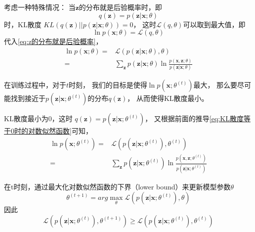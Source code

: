 \documentclass[withoutpreface,bwprint]{NoteBook}
\begin{document}
考虑一种特殊情况：
当$\mathbf{z}$的分布就是后验概率时，即
\begin{equation}
    \label{eq:z的分布就是后验概率}
    q(\mathbf{z}) = p(\mathbf{z}|\mathbf{x};\theta)
\end{equation}
时，KL散度 $ KL(q(\mathbf{z})||p(\mathbf{z}|\mathbf{x};\theta)) = 0 $，
这时$\mathcal{L}(q,\theta)$可以取到最大值，即
$$
\ln p(\mathbf{x};\theta) = \mathcal{L}(q,\theta)
$$
代入\cref{eq:z的分布就是后验概率}，
\begin{align}
    \label{eq:KL散度等于0时的对数似然函数}
    \ln p(\mathbf{x};\theta) 
    =& \mathcal{L}( p(\mathbf{z}|\mathbf{x};\theta),\theta) \nonumber \\
    =& \sum_{\mathbf{z}} p(\mathbf{z}|\mathbf{x};\theta) \ln \frac{p(\mathbf{x},\mathbf{z};\theta)}{p(\mathbf{z}|\mathbf{x};\theta)}
\end{align}

在训练过程中，对于$t$时刻，
我们的目标是使得$\ln p(\mathbf{x};\theta^{(t)})$最大，
那么要尽可能找到接近于$p(\mathbf{z}|\mathbf{x};\theta^{(t)})$的分布$q(\mathbf{z})$，
从而使得KL散度最小。

KL散度最小为0，这时
$
q(\mathbf{z}) = p(\mathbf{z}|\mathbf{x};\theta^{(t)})
$，
又根据前面的推导\cref{eq:KL散度等于0时的对数似然函数}可知，
\begin{align}
    \label{eq:t时刻KL散度等于0时的对数似然函数}
    \ln p(\mathbf{x};\theta^{(t)}) 
    =& \mathcal{L}( p(\mathbf{z}|\mathbf{x};\theta^{(t)}),\theta^{(t)}) \nonumber \\
    =& \sum_{\mathbf{z}} p(\mathbf{z}|\mathbf{x};\theta^{(t)}) \ln \frac{p(\mathbf{x},\mathbf{z};\theta^{(t)})}{p(\mathbf{z}|\mathbf{x};\theta^{(t)})}
\end{align}

在t时刻，通过最大化对数似然函数的下界（lower bound）来更新模型参数$\theta$
\begin{equation}
    \label{eq:t时刻更新模型参数theta}
    \theta^{(t+1)} = arg\max_{\theta} \mathcal{L}( p(\mathbf{z}|\mathbf{x};\theta^{(t)}),\theta)
\end{equation}
因此
\begin{equation}
    \label{eq:t时刻更新模型参数theta后的lower_bound}
    \mathcal{L}( p(\mathbf{z}|\mathbf{x};\theta^{(t)}),\theta^{(t+1)}) \geq \mathcal{L}( p(\mathbf{z}|\mathbf{x};\theta^{(t)}),\theta^{(t)})
\end{equation}
\end{document}
